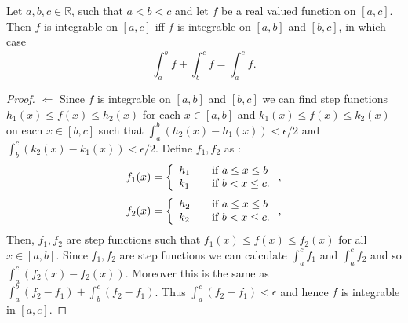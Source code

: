 \begin{Theorem}
    Let $a,b,c \in \mathbb{R}$, such that $a < b < c $ and let $f$ be a real valued function on
    $\left[a,c\right]$. Then $f$ is integrable on $\left[a,c\right]$ iff $f$ is integrable on 
    $\left[a,b\right]$ and $\left[b,c\right]$, in which case 
    \[ \int_a^b f + \int_b^c f = \int_a^c f .\]
\end{Theorem}
\begin{proof}
    $\Leftarrow$
    Since $f$ is integrable on $\left[a,b\right]$ and $\left[b,c\right]$ we can find step functions
    $h_1(x) \leq f(x) \leq h_2(x)$ for each $x \in \left[a,b\right]$ and $k_1(x) \leq f(x) \leq
    k_2(x)$ on each $x \in \left[b,c\right]$ such that $\int_a^b (h_2(x) - h_1(x)) < \epsilon /2$
    and $\int_b^c(k_2(x) - k_1(x)) < \epsilon/2$. Define $f_1,f_2$ as :
    \[ f_{1}(x) = \left\{ 
	    \begin{array}{l l}
		h_1 & \quad \text{if } a \leq x \leq b \\
		k_1 & \quad \text{if } b < x \leq c. 
	    \end{array} \right. ,\]
    \[ f_{2}(x) = \left\{ 
	    \begin{array}{l l}
		h_2 & \quad \text{if } a \leq x \leq b \\
		k_2 & \quad \text{if } b < x \leq c. 
	    \end{array} \right. ,\]
    Then, $f_1,f_2$ are step functions such that $f_1(x) \leq f(x) \leq f_2(x)$ for all $x \in
    \left[a,b\right]$. Since $f_1,f_2$ are step functions we can calculate $\int_a^c f_1$ and
    $\int_a^c f_2$ and so $\int_a^c (f_2(x) - f_2(x))$. Moreover this is the same as $\int_a^b (f_2
    -f_1) + \int_b^c (f_2 - f_1)$. Thus $\int_a^c (f_2 - f_1) < \epsilon$ and hence $f$ is integrable
    in $\left[a,c\right]$.
    

\end{proof}
